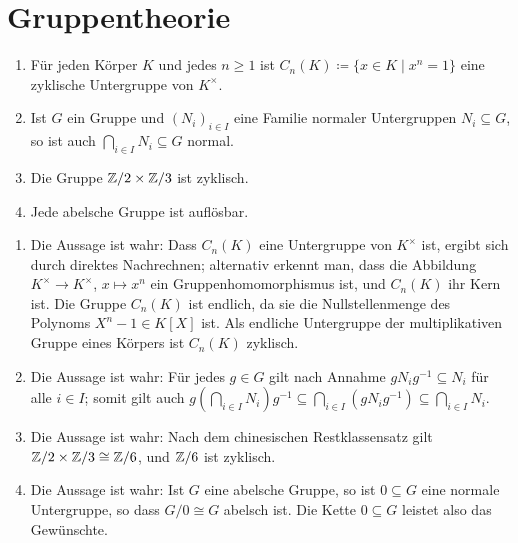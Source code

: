 \section{Gruppentheorie}




\begin{question}[subtitle = Wahr oder Falsch?]
  \begin{enumerate}
    \item
      Für jeden Körper $K$ und jedes $n \geq 1$ ist $C_n(K) \coloneqq \{x \in K \mid x^n = 1\}$ eine zyklische Untergruppe von $K^\times$.
    \item
      Ist $G$ ein Gruppe und $(N_i)_{i \in I}$ eine Familie normaler Untergruppen $N_i \subseteq G$, so ist auch $\bigcap_{i \in I} N_i \subseteq G$ normal.
    \item
      Die Gruppe $\mathbb{Z}/2 \times \mathbb{Z}/3$ ist zyklisch.
    \item
      Jede abelsche Gruppe ist auflösbar.
  \end{enumerate}
\end{question}


\begin{solution}
  \begin{enumerate}
    \item
      Die Aussage ist wahr:
      Dass $C_n(K)$ eine Untergruppe von $K^\times$ ist, ergibt sich durch direktes Nachrechnen;
      alternativ erkennt man, dass die Abbildung $K^\times \to K^\times$, $x \mapsto x^n$ ein Gruppenhomomorphismus ist, und $C_n(K)$ ihr Kern ist.
      Die Gruppe $C_n(K)$ ist endlich, da sie die Nullstellenmenge des Polynoms $X^n - 1 \in K[X]$ ist.
      Als endliche Untergruppe der multiplikativen Gruppe eines Körpers ist $C_n(K)$ zyklisch.
    \item
      Die Aussage ist wahr:
      Für jedes $g \in G$ gilt nach Annahme $g N_i g^{-1} \subseteq N_i$ für alle $i \in I$;
      somit gilt auch $g \left( \bigcap_{i \in I} N_i \right) g^{-1} \subseteq \bigcap_{i \in I} (g N_i g^{-1}) \subseteq \bigcap_{i \in I} N_i$.
    \item
      Die Aussage ist wahr:
      Nach dem chinesischen Restklassensatz gilt $\mathbb{Z}/2 \times \mathbb{Z}/3 \cong \mathbb{Z}/6$, und $\mathbb{Z}/6$ ist zyklisch.
    \item
      Die Aussage ist wahr:
      Ist $G$ eine abelsche Gruppe, so ist $0 \subseteq G$ eine normale Untergruppe, so dass $G/0 \cong G$ abelsch ist.
      Die Kette $0 \subseteq G$ leistet also das Gewünschte.
  \end{enumerate}
\end{solution}


